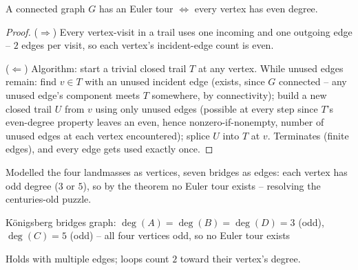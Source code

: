 \documentclass[11pt]{article}
\begin{document}
\begin{theorem}
A connected graph $G$ has an Euler tour $\iff$ every vertex has even degree.
\end{theorem}
\begin{proof}
($\Rightarrow$) Every vertex-visit in a trail uses one incoming and one outgoing edge -- $2$ edges per visit, so each vertex's incident-edge count is even.

($\Leftarrow$) Algorithm: start a trivial closed trail $T$ at any vertex. While unused edges remain: find $v\in T$ with an unused incident edge (exists, since $G$ connected -- any unused edge's component meets $T$ somewhere, by connectivity); build a new closed trail $U$ from $v$ using only unused edges (possible at every step since $T$'s even-degree property leaves an even, hence nonzero-if-nonempty, number of unused edges at each vertex encountered); splice $U$ into $T$ at $v$. Terminates (finite edges), and every edge gets used exactly once.
\end{proof}

\begin{note}[Königsberg]
Modelled the four landmasses as vertices, seven bridges as edges: each vertex has odd degree ($3$ or $5$), so by the theorem no Euler tour exists -- resolving the centuries-old puzzle.
\end{note}

\begin{center}
\end{center}
\begin{center}
\small Königsberg bridges graph: $\deg(A)=\deg(B)=\deg(D)=3$ (odd), $\deg(C)=5$ (odd) -- all four vertices odd, so no Euler tour exists
\end{center}

\begin{note}
Holds with multiple edges; loops count $2$ toward their vertex's degree.
\end{note}
\end{document}
